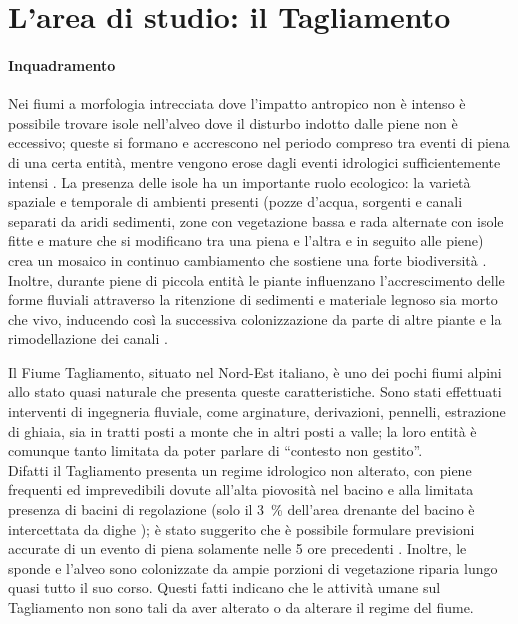 \section{L'area di studio: il Tagliamento}
\label{sec:descr-area-studio}
\paragraph{Inquadramento}
Nei fiumi a morfologia intrecciata dove l'impatto antropico non è intenso è possibile trovare isole nell'alveo dove il disturbo indotto dalle piene non è eccessivo;
queste si formano e accrescono nel periodo compreso tra eventi di piena di una certa entità, mentre vengono erose dagli eventi idrologici sufficientemente intensi .
La presenza delle isole ha un importante ruolo ecologico: la varietà spaziale e temporale di ambienti presenti (pozze d'acqua, sorgenti e canali separati da aridi sedimenti, zone con vegetazione bassa e rada alternate con isole fitte e mature che si modificano tra una piena e l'altra e in seguito alle piene) crea un mosaico in continuo cambiamento che sostiene una forte biodiversità .
Inoltre, durante piene di piccola entità le piante influenzano l'accrescimento delle forme fluviali attraverso la ritenzione di sedimenti e materiale legnoso sia morto che vivo, inducendo così la successiva colonizzazione da parte di altre piante e la rimodellazione dei canali .


Il Fiume Tagliamento, situato nel Nord-Est italiano, è uno dei pochi fiumi alpini allo stato quasi naturale che presenta queste caratteristiche. 
Sono stati effettuati interventi di ingegneria fluviale, come arginature, derivazioni, pennelli, estrazione di ghiaia, sia in tratti posti a monte che in altri posti a valle; la loro entità è comunque tanto limitata da poter parlare di “contesto non gestito”.
\\
Difatti il Tagliamento presenta un regime idrologico non alterato, con piene frequenti ed imprevedibili dovute all'alta piovosità nel bacino  e alla limitata presenza di bacini di regolazione (solo il \SI{3}{\percent} dell'area drenante del bacino è intercettata da dighe );
è stato suggerito che è possibile formulare previsioni accurate di un evento di piena solamente nelle 5 ore precedenti . 
Inoltre, le sponde e l'alveo sono colonizzate da ampie porzioni di vegetazione riparia lungo quasi tutto il suo corso. 
Questi fatti indicano che le attività umane sul Tagliamento non sono tali da aver alterato o da alterare il regime del fiume.

